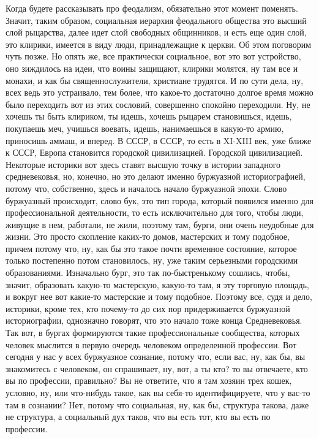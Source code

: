 Когда будете рассказывать про феодализм, обязательно этот момент поменять.
Значит, таким образом, социальная иерархия феодального общества это высший слой
рыцарства, далее идет слой свободных общинников, и есть еще один слой, это
клирики, имеется в виду люди, принадлежащие к церкви. Об этом поговорим чуть
позже. Но опять же, все практически социальное, вот это вот устройство, оно
зиждилось на идеи, что воины защищают, клирики молятся, ну там все и монахи, и
как бы священнослужители, христиане трудятся. И по сути дела, ну, всех ведь это
устраивало, тем более, что какое-то достаточно долгое время можно было
переходить вот из этих сословий, совершенно спокойно переходили. Ну, не хочешь
ты быть клириком, ты идешь, хочешь рыцарем становишься, идешь, покупаешь меч,
учишься воевать, идешь, нанимаешься в какую-то армию, приносишь аммаш, и вперед.
В СССР, в СССР, то есть в XI-XIII век, уже ближе к СССР, Европа становится
городской цивилизацией. Городской цивилизацией. Некоторые историки вот здесь
ставят высшую точку в истории западного средневековья, но, конечно, но это
делают именно буржуазной историографией, потому что, собственно, здесь и
началось начало буржуазной эпохи. Слово буржуазный происходит, слово бук, это
тип города, который появился именно для профессиональной деятельности, то есть
исключительно для того, чтобы люди, живущие в нем, работали, не жили, поэтому
там, бурги, они очень неудобные для жизни. Это просто скопление каких-то домов,
мастерских и тому подобное, причем потому что, ну, как бы это такое почти
временное состояние, которое только постепенно потом становилось, ну, уже таким
серьезными городскими образованиями. Изначально бург, это так по-быстренькому
сошлись, чтобы, значит, образовать какую-то мастерскую, какую-то там, я эту
торговую площадь, и вокруг нее вот какие-то мастерские и тому подобное. Поэтому
все, судя и дело, историки, кроме тех, кто почему-то до сих пор придерживается
буржуазной историографии, однозначно говорят, что это начало тоже конца
Средневековья. Так вот, в бургах формируются такие профессиональные сообщества,
которых человек мыслится в первую очередь человеком определенной профессии. Вот
сегодня у нас у всех буржуазное сознание, потому что, если вас, ну, как бы, вы
знакомитесь с человеком, он спрашивает, ну, вот, а ты кто? то вы отвечаете, кто
вы по профессии, правильно? Вы не ответите, что я там хозяин трех кошек,
условно, ну, или что-нибудь такое, как вы себя-то идентифицируете, что у вас-то
там в сознании? Нет, потому что социальная, ну, как бы, структура такова, даже
не структура, а социальный дух таков, что вы есть тот, кто вы есть по профессии.
